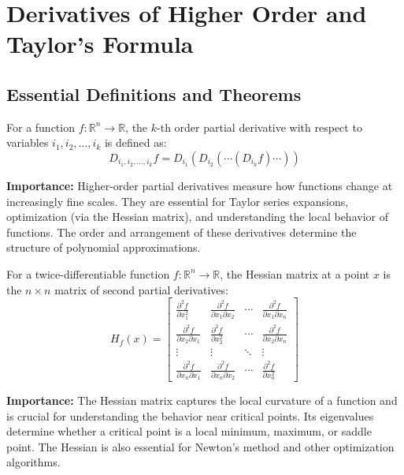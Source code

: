 \section{Derivatives of Higher Order and Taylor's Formula}

\subsection*{Essential Definitions and Theorems}

\begin{definition}
For a function $f: \mathbb{R}^n \to \mathbb{R}$, the $k$-th order partial derivative with respect to variables $i_1, i_2, \ldots, i_k$ is defined as:
\[D_{i_1, i_2, \ldots, i_k} f = D_{i_1}(D_{i_2}(\cdots(D_{i_k} f)\cdots))\]
\end{definition}

\noindent\textbf{Importance:} Higher-order partial derivatives measure how functions change at increasingly fine scales. They are essential for Taylor series expansions, optimization (via the Hessian matrix), and understanding the local behavior of functions. The order and arrangement of these derivatives determine the structure of polynomial approximations.



\begin{definition}
For a twice-differentiable function $f: \mathbb{R}^n \to \mathbb{R}$, the Hessian matrix at a point $x$ is the $n \times n$ matrix of second partial derivatives:
\[H_f(x) = \begin{bmatrix} 
\frac{\partial^2 f}{\partial x_1^2} & \frac{\partial^2 f}{\partial x_1 \partial x_2} & \cdots & \frac{\partial^2 f}{\partial x_1 \partial x_n} \\
\frac{\partial^2 f}{\partial x_2 \partial x_1} & \frac{\partial^2 f}{\partial x_2^2} & \cdots & \frac{\partial^2 f}{\partial x_2 \partial x_n} \\
\vdots & \vdots & \ddots & \vdots \\
\frac{\partial^2 f}{\partial x_n \partial x_1} & \frac{\partial^2 f}{\partial x_n \partial x_2} & \cdots & \frac{\partial^2 f}{\partial x_n^2}
\end{bmatrix}\]
\end{definition}

\noindent\textbf{Importance:} The Hessian matrix captures the local curvature of a function and is crucial for understanding the behavior near critical points. Its eigenvalues determine whether a critical point is a local minimum, maximum, or saddle point. The Hessian is also essential for Newton's method and other optimization algorithms.



